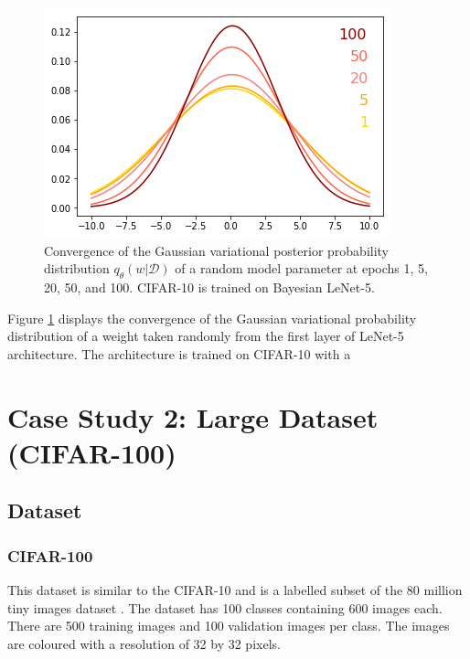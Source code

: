 \begin{figure}[H] 
\begin{center}
\includegraphics[width=\linewidth]{Chapter5/Figs/distribution.png}
\caption{Convergence of the Gaussian variational posterior probability distribution $q_{\theta}(w|\mathcal{D})$ of a random model parameter at epochs 1, 5, 20, 50, and 100. CIFAR-10 is trained on Bayesian LeNet-5.}
\label{fig:distribution}
\end{center}
\end{figure} 

\newline Figure \ref{fig:distribution} displays the convergence of the Gaussian variational probability distribution of a weight taken randomly from the first layer of LeNet-5 architecture. The architecture is trained on CIFAR-10 with a 



\section{Case Study 2: Large Dataset (CIFAR-100)}
\subsection{Dataset}

\subsubsection{CIFAR-100}
This dataset is similar to the CIFAR-10 and is a labelled subset of the 80 million tiny images dataset \cite{Torralba:2008:MTI:1444381.1444403}. The dataset has 100 classes containing 600 images each. There are 500 training images and 100 validation images per class. The images are coloured with a resolution of 32 by 32 pixels.

